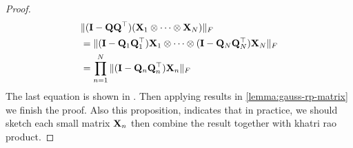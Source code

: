 \begin{proof}
\begin{equation}
\begin{aligned}
& \|(\mathbf{I} - \mathbf{QQ}^\top)  (\mathbf{X}_1\otimes \cdots \otimes \mathbf{X}_N)\|_F \\
& = \|(\mathbf{I} - \mathbf{Q}_1\mathbf{Q}_1^\top) \mathbf{X}_1 \otimes \cdots \otimes (\mathbf{I} - \mathbf{Q}_N\mathbf{Q}_N^\top) \mathbf{X}_N  \|_F\\
& =\prod_{n=1}^N \|(\mathbf{I} - \mathbf{Q}_n\mathbf{Q}_n^\top) \mathbf{X}_n\|_F
\end{aligned}
\end{equation}
The last equation is shown in \citep{schacke2013kronecker}. 
Then applying results in \ref{lemma:gauss-rp-matrix} we finish the proof.  Also this proposition, indicates that in practice, we should sketch each small matrix $\mathbf{X}_n$  then combine the result together with khatri rao product. 
\end{proof}





